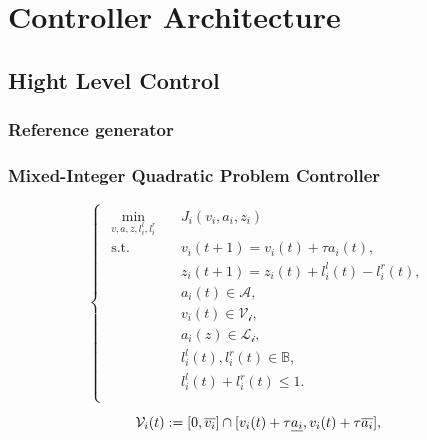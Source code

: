 \chapter{Controller Architecture}
\label{controller_architecture}
\section{Hight Level Control}




\subsection{Reference generator}






\subsection{Mixed-Integer Quadratic Problem Controller}

\begin{equation}

\left\{ \begin{matrix}
\begin{aligned}
\min_{v,a,z, l_i^l,l_i^r} \quad & J_i\left ( v_i, a_i, z_i \right )\\
\textrm{s.t.} \quad & v_i(t+1) = v_i(t)+\tau a_i(t),\\
  &   z_i(t+1) = z_i(t) + l_i^l(t) - l_i^r(t),   \\
& a_i(t) \in \mathcal{A} ,  \\
& v_i(t) \in \mathcal{V_i} ,  \\
& a_i(z) \in \mathcal{L_i} ,  \\
&  l_i^l(t),l_i^r(t)\in \mathbb{B},   \\
& l_i^l(t) + l_i^r(t)  \leq 1.\\
\end{aligned}
\end{matrix}\right.

\end{equation}

\begin{equation}
    \mathcal{V}_i(t) := [0,\overline{v_i}] \cap[v_i(t)+\tau \underline{a_i}, v_i(t)+\tau \overline{a_i} ],\\
\end{equation}
   
